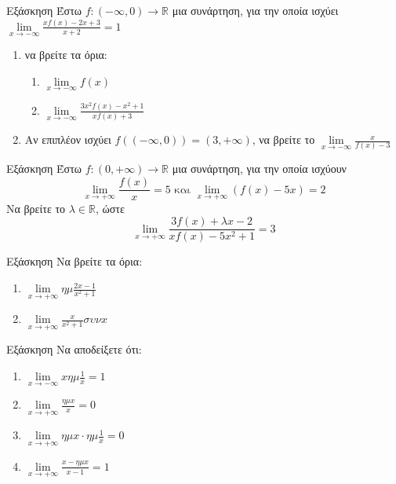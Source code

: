 \documentclass[greek]{beamer}
\begin{document}
\begin{frame}{Εξάσκηση}
 Έστω $f:(-\infty,0)\to\mathbb{R}$ μια συνάρτηση, για την οποία ισχύει $\lim\limits_{x \to -\infty}{ \frac{xf(x)-2x+3}{x+2}  }=1$
 \begin{enumerate}
  \item να βρείτε τα όρια:
        \begin{enumerate}
         \item $\lim\limits_{x \to -\infty}{ f(x) }$ \pause
         \item $\lim\limits_{x \to -\infty}{ \frac{3x^2f(x)-x^2+1}{xf(x)+3}  }$
        \end{enumerate}
  \item Αν επιπλέον ισχύει $f\left( (-\infty,0) \right)=(3,+\infty) $, να βρείτε το $\lim\limits_{x \to -\infty}{ \frac{x}{f(x)-3} }$
 \end{enumerate}
\end{frame}

\begin{frame}{Εξάσκηση}
 Έστω $f:(0,+\infty)\to\mathbb{R}$ μια συνάρτηση, για την οποία ισχύουν
 $$\lim\limits_{x \to +\infty}{ \frac{f(x)}{x} }=5 \text{ και } \lim\limits_{x \to +\infty}{ (f(x)-5x) }=2$$
 Να βρείτε το $λ\in\mathbb{R}$, ώστε
 $$\lim\limits_{x \to +\infty}{ \frac{3f(x)+λx-2}{xf(x)-5x^2+1} }=3$$
\end{frame}

\begin{frame}{Εξάσκηση}
 Να βρείτε τα όρια:
 \begin{enumerate}
  \item $\lim\limits_{x \to +\infty}{ ημ\frac{2x-1}{x^2+1} }$ \pause
  \item $\lim\limits_{x \to +\infty}{ \frac{x}{x^2+1}συνx  }$
 \end{enumerate}
\end{frame}

\begin{frame}{Εξάσκηση}
 Να αποδείξετε ότι:
 \begin{enumerate}
  \item $\lim\limits_{x \to -\infty}{ xημ\frac{1}{x} }=1$ \pause
  \item $\lim\limits_{x \to +\infty}{ \frac{ημx}{x}  }=0$  \pause
  \item $\lim\limits_{x \to +\infty}{ ημx\cdot ημ\frac{1}{x}  }=0$  \pause
  \item $\lim\limits_{x \to +\infty}{ \frac{x-ημx}{x-1}  }=1$
 \end{enumerate}
\end{frame}
\end{document}
